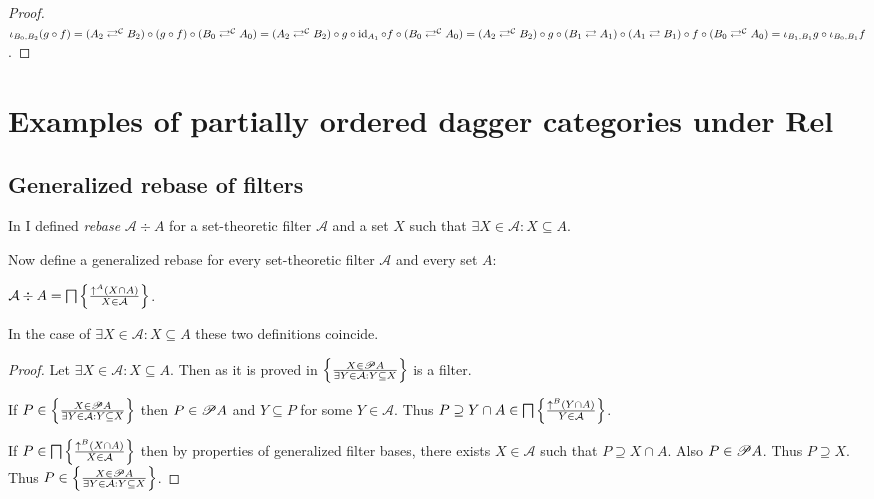 \begin{proof}
  $\iota_{B_0, B_2} (g \circ f) = (A_2 \rightleftarrows^{\mathcal{C}} B_2)
  \circ (g \circ f) \circ (B_0 \rightleftarrows^{\mathcal{C}} A_0) = (A_2
  \rightleftarrows^{\mathcal{C}} B_2) \circ g \circ \operatorname{id}_{A_1} \circ f
  \circ (B_0 \rightleftarrows^{\mathcal{C}} A_0) = (A_2
  \rightleftarrows^{\mathcal{C}} B_2) \circ g \circ (B_1 \rightleftarrows A_1)
  \circ (A_1 \rightleftarrows B_1) \circ f \circ (B_0
  \rightleftarrows^{\mathcal{C}} A_0) = \iota_{B_1, B_1} g \circ \iota_{B_0,
  B_1} f$.
\end{proof}

\section{\texorpdfstring{Examples of partially ordered dagger categories under
$\mathbf{Rel}$}{Examples of partially ordered dagger categories under Rel}}

\subsection{Generalized rebase of filters}

In \cite{volume-1} I defined \emph{rebase} $\mathcal{A} \div A$ for a
set-theoretic filter $\mathcal{A}$ and a set $X$ such that $\exists X \in
\mathcal{A} : X \subseteq A$.

Now define a generalized rebase for every set-theoretic filter $\mathcal{A}$
and every set $A$:

\begin{defn}
  $\mathcal{A} \div A = \bigsqcap \left\{ \frac{ \uparrow^A  (X \cap A) }{ X \in \mathcal{A} }\right\}$.
\end{defn}

\begin{prop}
  In the case of $\exists X \in \mathcal{A} : X \subseteq A$ these two
  definitions coincide.
\end{prop}

\begin{proof}
  Let $\exists X \in \mathcal{A} : X \subseteq A$. Then as it is proved in
{\cite{volume-1}} $\left\{ \frac{ X \in \mathscr{P} A }{\exists Y \in \mathcal{A} : Y \subseteq X }\right\}$ is a filter.

If $P \in \left\{ \frac{ X \in \mathscr{P} A }{ \exists Y
\in \mathcal{A} : Y \subseteq X }\right\}$ then $P \in \mathscr{P} A$ and $Y
\subseteq P$ for some $Y \in \mathcal{A}$. Thus $P \supseteq Y \cap A \in
\bigsqcap \left\{ \frac{ \uparrow^B  (Y \cap A) }{ Y \in \mathcal{A} }\right\}$.

If $P \in \bigsqcap \left\{ \frac{ \uparrow^B  (X \cap A) }{
X \in \mathcal{A} }\right\}$ then by properties of generalized filter bases,
there exists $X \in \mathcal{A}$ such that $P \supseteq X \cap A$. Also $P \in
\mathscr{P} A$. Thus $P \supseteq X$. Thus $P \in \left\{ \frac{ X \in \mathscr{P} A
}{ \exists Y \in \mathcal{A} : Y \subseteq X }\right\}$.

\end{proof}

